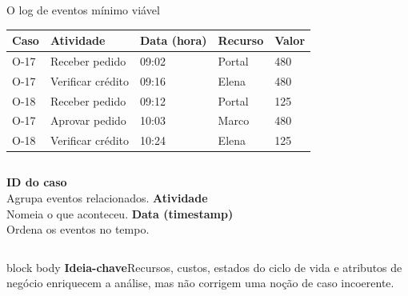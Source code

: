 \documentclass[aspectratio=169,11pt]{beamer}
\newcommand{\keyidea}[1]{%
  \begin{beamercolorbox}[rounded=true,sep=0.65em]{block body}
    \textbf{\color{Teal}Ideia-chave}\quad #1
  \end{beamercolorbox}
}
\begin{document}
\begin{frame}{O log de eventos mínimo viável}
  \small
  \begin{tabular}{@{}lllll@{}}
    \toprule
    Caso & Atividade & Data (hora) & Recurso & Valor\\
    \midrule
    O-17 & Receber pedido & 09:02 & Portal & 480\\
    O-17 & Verificar crédito & 09:16 & Elena & 480\\
    O-18 & Receber pedido & 09:12 & Portal & 125\\
    O-17 & Aprovar pedido & 10:03 & Marco & 480\\
    O-18 & Verificar crédito & 10:24 & Elena & 125\\
    \bottomrule
  \end{tabular}

  \vspace{0.55cm}
  \begin{columns}[T,onlytextwidth]
      \textbf{ID do caso}\\Agrupa eventos relacionados.
      \textbf{Atividade}\\Nomeia o que aconteceu.
      \textbf{Data (timestamp)}\\Ordena os eventos no tempo.
  \end{columns}
  \vspace{0.35cm}
  \keyidea{Recursos, custos, estados do ciclo de vida e atributos de negócio enriquecem a análise, mas não corrigem uma noção de caso incoerente.}
\end{frame}
\end{document}
